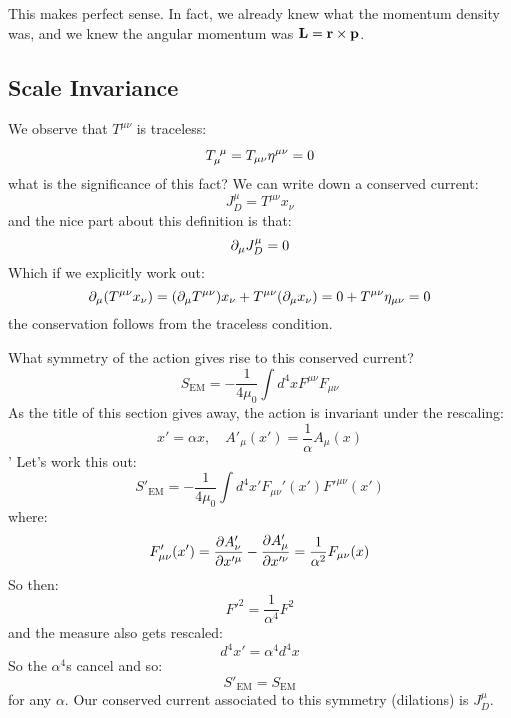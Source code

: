 This makes perfect sense. In fact, we already knew what the momentum density was, and we knew the angular momentum was $\mathbf{L} = \mathbf{r} \times \mathbf{p}$.

\subsection{Scale Invariance}
We observe that $T^{\mu\nu}$ is traceless:
\begin{equation}
    T_{\mu}^{\sp\mu} = T_{\mu\nu}\eta^{\mu\nu} = 0
\end{equation}
what is the significance of this fact? We can write down a conserved current:
\begin{equation}
    J^\mu_{D} = T^{\mu\nu}x_\nu
\end{equation}
and the nice part about this definition is that:
\begin{equation}
    \partial_\mu J^{\mu}_D = 0
\end{equation}
Which if we explicitly work out:
\begin{equation}
    \partial_\mu (T^{\mu\nu}x_\nu) = (\partial_\mu T^{\mu\nu})x_\nu + T^{\mu\nu}(\partial_\mu x_\nu) = 0 + T^{\mu\nu}\eta_{\mu\nu} = 0
\end{equation}
the conservation follows from the traceless condition.

What symmetry of the action gives rise to this conserved current?
\begin{equation}
    S_{\text{EM}} = -\frac{1}{4\mu_0}\int d^4x F^{\mu\nu}F_{\mu\nu}
\end{equation}
As the title of this section gives away, the action is invariant under the rescaling:
\begin{equation}
    x' = \alpha x, \quad A'_\mu(x') = \frac{1}{\alpha}A_\mu(x)
\end{equation}'
Let's work this out:
\begin{equation}
    S'_{\text{EM}} = -\frac{1}{4\mu_0}\int d^4x' F_{\mu\nu}'(x')F'^{\mu\nu}(x')
\end{equation}
where:
\begin{equation}
    F_{\mu\nu}'(x') = \frac{\partial A'_\nu}{\partial x'^\mu} - \frac{\partial A'_\mu}{\partial x'^\nu} = \frac{1}{\alpha^2}F_{\mu\nu}(x)
\end{equation}
So then:
\begin{equation}
    F'^2 = \frac{1}{\alpha^4}F^2
\end{equation}
and the measure also gets rescaled:
\begin{equation}
    d^4x' = \alpha^4 d^4x
\end{equation}
So the $\alpha^4$s cancel and so:
\begin{equation}
    S'_{\text{EM}} = S_{\text{EM}}
\end{equation}
for any $\alpha$. Our conserved current associated to this symmetry (dilations) is $J^\mu_D$.

